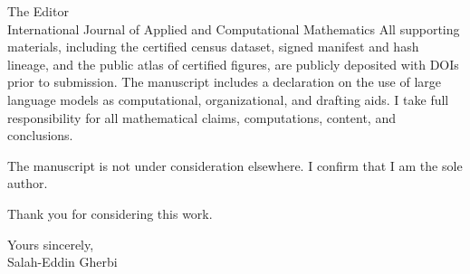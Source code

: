 \documentclass[10pt]{letter}
\begin{document}
\begin{letter}{
The Editor\\
International Journal of Applied and Computational Mathematics
}
All supporting materials, including the certified census dataset, signed
manifest and hash lineage, and the public atlas of certified figures, are
publicly deposited with DOIs prior to submission. The manuscript includes a
declaration on the use of large language models as computational,
organizational, and drafting aids. I take full responsibility for all
mathematical claims, computations, content, and conclusions.

The manuscript is not under consideration elsewhere. I confirm that I am the
sole author.

Thank you for considering this work.

\vspace{0.8em}

\noindent Yours sincerely,\\[1.5em]
Salah-Eddin Gherbi

\end{letter}
\end{document}
